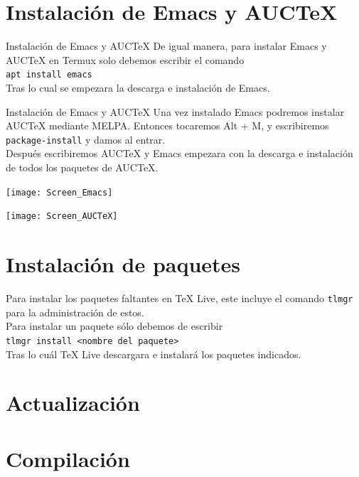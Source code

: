 \documentclass[12pt,aspectratio=43]{beamer}
\newcommand{\lmr}{\fontfamily{lmr}\selectfont}
\begin{document}
\section{Instalación de Emacs y AUCTeX}
\begin{frame}{Instalación de Emacs y AUC{\TeX}}{}
De igual manera, para instalar Emacs y AUC{\TeX} en Termux solo debemos escribir el comando\\[1em]

\texttt{apt install emacs}\pause\\[1em]

Tras lo cual se empezara la descarga e instalación de Emacs.
\end{frame}

\begin{frame}{Instalación de Emacs y AUC{\TeX}}
Una vez instalado Emacs podremos instalar AUC{\TeX} mediante MELPA. Entonces tocaremos Alt + M, y escribiremos \texttt{package-install} y damos al entrar.\pause\\[1em]

Después escribiremos AUC{\TeX} y Emacs empezara con la descarga e instalación de todos los paquetes de AUC{\TeX}.
\end{frame}

\begin{frame}[plain]
\begin{center}
	\texttt{[image: Screen\_Emacs]}
\end{center}
\end{frame}

\begin{frame}[plain]
\begin{center}
	\texttt{[image: Screen\_AUCTeX]}
\end{center}
\end{frame}

\section{Instalación de paquetes}
\begin{frame}
Para instalar los paquetes faltantes en {\lmr\TeX} Live, este incluye el comando \texttt{tlmgr} para la administración de estos.\pause\\[1em]

Para instalar un paquete sólo debemos de escribir\\[1em]

\texttt{tlmgr install <nombre del paquete>}\pause\\[1em]

Tras lo cuál {\lmr\TeX} Live descargara e instalará los paquetes indicados.
\end{frame}

\section{Actualización}

\section{Compilación}
\end{document}
